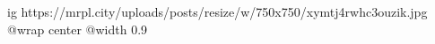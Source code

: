  
 
 
 
 

\ifcmt
  ig https://mrpl.city/uploads/posts/resize/w/750x750/xymtj4rwhc3ouzik.jpg
  @wrap center
  @width 0.9
\fi
